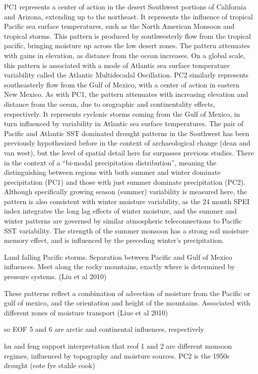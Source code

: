 \documentclass[11pt]{wlscirep}
\begin{document}
PC1 represents a center of action in the desert Southwest portions of California and Arizona, extending up to the northeast. It represents the influence of tropical Pacific sea surface temperatures, such as the North American Monsoon and tropical storms. This pattern is produced by southwesterly flow from the tropical pacific, bringing moisture up across the low desert zones. The pattern attenuates with gains in elevation, as distance from the ocean increases. On a global scale, this pattern is associated with a mode of Atlantic sea surface temperature variability called the Atlantic Multidecadal Oscillation. PC2 similarly represents southeasterly flow from the Gulf of Mexico, with a center of action in eastern New Mexico. As with PC1, the pattern attenuates with increasing elevation and distance from the ocean, due to orographic and continentality effects, respectively. It represents cyclonic storms coming from the Gulf of Mexico, in turn influenced by variability in Atlantic sea surface temperatures. The pair of Pacific and Atlantic SST dominated drought patterns in the Southwest has been previously hypothesized before in the context of archaeological change (dean and van west), but the level of spatial detail here far surpasses previous studies. There in the context of a ``bi-modal precipitation distribution'', meaning the distinguishing between regions with both summer and winter dominate precipitation (PC1) and those with just summer dominate precipitation (PC2). Although specifically growing season (summer) variability is measured here, the pattern is also consistent with winter moisture variability, as the 24 month SPEI index integrates the long lag effects of winter moisture, and the summer and winter patterns are governed by similar atmospheric teleconnections to Pacific SST variability. The strength of the summer monsoon has a strong soil moisture memory effect, and is influenced by the preceding winter's precipitation.

Land falling Pacific storms. Separation between Pacific and Gulf of Mexico influences. Meet along the rocky mountains, exactly where is determined by pressure systems. (Liu et al 2010)

These patterns reflect a combination of advection of moisture from the Pacific or gulf of mexico, and the orientation and height of the mountains.
Associated with different zones of moisture transport (Liue et al 2010)

so EOF 5 and 6 are arctic and continental influences, respectively

hu and feng support interpretation that reof 1 and 2 are different monsoon regimes, influenced by topography and moisture sources.
PC2 is the 1950s drought (cote fye stahle cook)
\end{document}
